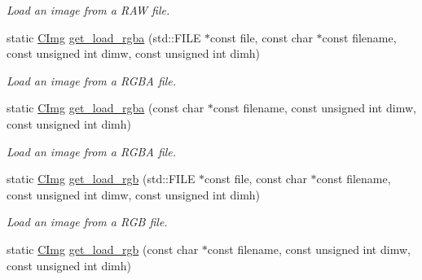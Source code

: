 \begin{DoxyCompactItemize}
\begin{DoxyCompactList}\small\item\em Load an image from a RAW file. \item\end{DoxyCompactList}\item 
\hypertarget{structcimg__library_1_1_c_img_aed4dc2820c667c07afcc3e362c23c117}{
static \hyperlink{structcimg__library_1_1_c_img}{CImg} \hyperlink{structcimg__library_1_1_c_img_aed4dc2820c667c07afcc3e362c23c117}{get\_\-load\_\-rgba} (std::FILE $\ast$const file, const char $\ast$const filename, const unsigned int dimw, const unsigned int dimh)}
\label{structcimg__library_1_1_c_img_aed4dc2820c667c07afcc3e362c23c117}

\begin{DoxyCompactList}\small\item\em Load an image from a RGBA file. \item\end{DoxyCompactList}\item 
\hypertarget{structcimg__library_1_1_c_img_af78faae6e19f0a6753bd402f7c17e990}{
static \hyperlink{structcimg__library_1_1_c_img}{CImg} \hyperlink{structcimg__library_1_1_c_img_af78faae6e19f0a6753bd402f7c17e990}{get\_\-load\_\-rgba} (const char $\ast$const filename, const unsigned int dimw, const unsigned int dimh)}
\label{structcimg__library_1_1_c_img_af78faae6e19f0a6753bd402f7c17e990}

\begin{DoxyCompactList}\small\item\em Load an image from a RGBA file. \item\end{DoxyCompactList}\item 
\hypertarget{structcimg__library_1_1_c_img_a2f381d7d76854210ea6dff9db18c7f79}{
static \hyperlink{structcimg__library_1_1_c_img}{CImg} \hyperlink{structcimg__library_1_1_c_img_a2f381d7d76854210ea6dff9db18c7f79}{get\_\-load\_\-rgb} (std::FILE $\ast$const file, const char $\ast$const filename, const unsigned int dimw, const unsigned int dimh)}
\label{structcimg__library_1_1_c_img_a2f381d7d76854210ea6dff9db18c7f79}

\begin{DoxyCompactList}\small\item\em Load an image from a RGB file. \item\end{DoxyCompactList}\item 
\hypertarget{structcimg__library_1_1_c_img_ab1cd5934d4bde1ab9988670d1a78b06e}{
static \hyperlink{structcimg__library_1_1_c_img}{CImg} \hyperlink{structcimg__library_1_1_c_img_ab1cd5934d4bde1ab9988670d1a78b06e}{get\_\-load\_\-rgb} (const char $\ast$const filename, const unsigned int dimw, const unsigned int dimh)}
\label{structcimg__library_1_1_c_img_ab1cd5934d4bde1ab9988670d1a78b06e}


\end{DoxyCompactItemize}
